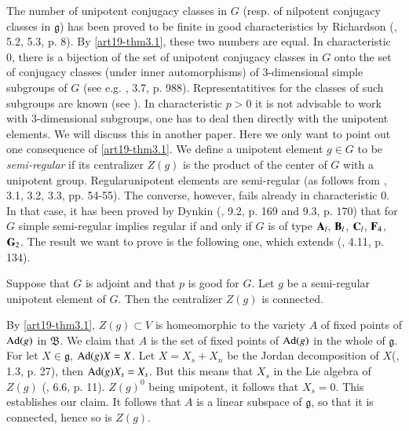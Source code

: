 The number of unipotent conjugacy classes in $G$ (resp. of nilpotent conjugacy classes in $\mathfrak{g}$) has been proved to be finite in good characteristics by Richardson (\cite{art19-key10}, 5.2, 5.3, p. 8). By \ref{art19-thm3.1}, these two numbers are equal. In characteristic 0, there is a bijection of the set of unipotent conjugacy classes in $G$ onto the set of conjugacy classes (under inner automorphisms) of 3-dimensional simple subgroups of $G$ (see e.g. \cite{art19-key8}, 3.7, p. 988). Representatitives for the classes of such subgroups are known (see \cite{art19-key6}). In characteristic $p>0$ it is not advisable to work with 3-dimensional subgroups, one has to deal then directly with the unipotent elements. We will discuss this in another paper. Here we only want to point out one consequence of \ref{art19-thm3.1}. We define a unipotent element $g\in G$ to be {\em semi-regular} if its centralizer $Z(g)$ is the product of the center of $G$ with a unipotent group. Regular\pageoriginale unipotent elements are semi-regular (as follows from \cite{art19-key15}, 3.1, 3.2, 3.3, pp. 54-55). The converse, however, fails already in characteristic 0. In that case, it has been proved by Dynkin (\cite{art19-key6}, 9.2, p. 169 and 9.3, p. 170) that for $G$ simple semi-regular implies regular if and only if $G$ is of type $\mathbf{A}_{l}$, $\mathbf{B}_{l}$, $\mathbf{C}_{l}$, $\mathbf{F}_{4}$, $\mathbf{G}_{2}$. The result we want to prove is the following one, which extends (\cite{art19-key14}, 4.11, p. 134).

\begin{proposition}\label{art19-prop4.6}
Suppose that $G$ is adjoint and that $p$ is good for $G$. Let $g$ be a semi-regular unipotent element of $G$. Then the centralizer $Z(g)$ is connected.
\end{proposition}

By \ref{art19-thm3.1}, $Z(g)\subset V$ is homeomorphic to the variety $A$ of fixed points of $\operatorname{\mathrm{Ad}}(g)$ in $\mathfrak{B}$. We claim that $A$ is the set of fixed points of $\operatorname{\mathrm{Ad}}(g)$ in the whole of $\mathfrak{g}$. For let $X\in \mathfrak{g}$, $\operatorname{\mathrm{Ad}}(g)X=X$. Let $X=X_{s}+X_{n}$ be the Jordan decomposition of $X$(\cite{art19-key1}, 1.3, p. 27), then $\operatorname{\mathrm{Ad}}(g)X_{s}=X_{s}$. But this means that $X_{s}$ in the Lie algebra of $Z(g)$ (\cite{art19-key10}, 6.6, p. 11). $Z(g)^{0}$ being unipotent, it follows that $X_{s}=0$. This establishes our claim. It follows that $A$ is a linear subspace of $\mathfrak{g}$, so that it is connected, hence so is $Z(g)$.

